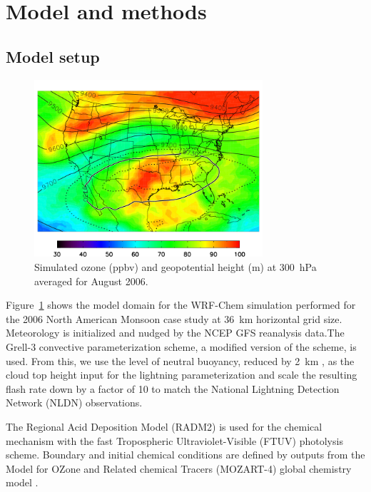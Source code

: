 \section{Model and methods}\label{sect:model}

\subsection{Model setup}

 \begin{figure}
 \noindent\includegraphics[width=20pc]{figures/o3_map.png}
 \caption{Simulated ozone (ppbv) and geopotential height (m) at 300~hPa averaged for August
2006.}
 \label{fig:2006_5/o3_map}
 \end{figure}

Figure~\ref{fig:2006_5/o3_map} shows the model domain for the WRF-Chem simulation performed
for the 2006 North American Monsoon case study at 36~km horizontal grid size. Meteorology
is initialized and nudged by the NCEP GFS reanalysis data.The Grell-3 convective
parameterization scheme, a modified version of the \citet{Grell:2002bs} scheme, is used.
From this, we use the level of neutral buoyancy, reduced by 2~km \citep{Wong:2013vn},
as the cloud top height input for the
\citet{Price:1992wb} lightning parameterization and scale the resulting flash rate down by a factor of 10 to match
the National Lightning Detection Network  (NLDN) \citep{Cummins:2009aa} observations.

The Regional Acid Deposition Model (RADM2) \citep{Stockwell:1990ez} is used for
the chemical mechanism with the fast Tropospheric Ultraviolet-Visible (FTUV)
\citep{Tie:2003ve} photolysis scheme. Boundary and initial chemical conditions are defined
by outputs from the Model for OZone and Related chemical Tracers (MOZART-4)
global chemistry model \citep{Emmons:2010fk}.

